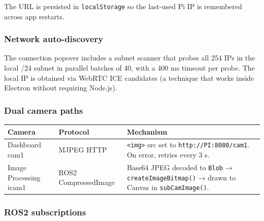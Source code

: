 \documentclass[11pt,a4paper]{article}
\begin{document}
The URL is persisted in \texttt{localStorage} so the last-used Pi IP is
remembered across app restarts.

\subsubsection{Network auto-discovery}

The connection popover includes a subnet scanner that probes all 254 IPs in
the local /24 subnet in parallel batches of 40, with a 400 ms timeout per
probe. The local IP is obtained via WebRTC ICE candidates (a technique that
works inside Electron without requiring Node.js).

\subsubsection{Dual camera paths}

\begin{center}
\begin{tabular}{llp{5.5cm}}
  \toprule
  \textbf{Camera} & \textbf{Protocol} & \textbf{Mechanism} \\
  \midrule
  Dashboard cam1 & MJPEG HTTP & \texttt{<img>} src set to \texttt{http://PI:8080/cam1}.
                                 On error, retries every 3 s. \\
  Image Processing icam1 & ROS2 CompressedImage & Base64 JPEG decoded to
                           \texttt{Blob} → \texttt{createImageBitmap()} →
                           drawn to Canvas in \texttt{subCamImage()}. \\
  \bottomrule
\end{tabular}
\end{center}

\subsubsection{ROS2 subscriptions}
\end{document}
